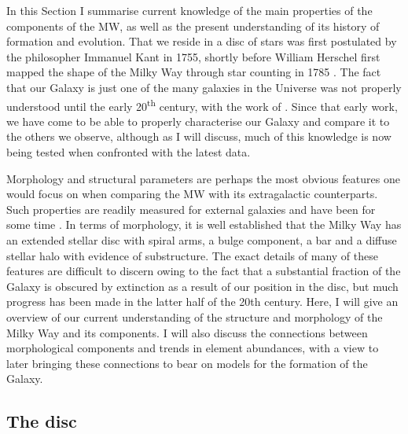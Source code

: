 
In this Section I summarise current knowledge of the main properties of the components of the MW, as well as the present understanding of its history of formation and evolution. That we reside in a disc of stars was first postulated by the philosopher Immanuel Kant in 1755, shortly before William Herschel first mapped the shape of the Milky Way through star counting in 1785 \citep{Herschel01011785}. The fact that our Galaxy is just one of the many galaxies in the Universe was not properly understood until the early 20\textsuperscript{th} century, with the work of \citet{1929ApJ....69..103H}. Since that early work, we have come to be able to properly characterise our Galaxy and compare it to the others we observe, although as I will discuss, much of this knowledge is now being tested when confronted with the latest data.

Morphology and structural parameters are perhaps the most obvious features one would focus on when comparing the MW with its extragalactic counterparts. Such properties are readily measured for external galaxies and have been for some time \citep[e.g.][]{1959HDP....53..311D}. In terms of morphology, it is well established that the Milky Way has an extended stellar disc with spiral arms, a bulge component, a bar and a diffuse stellar halo with evidence of substructure. The exact details of many of these features are difficult to discern owing to the fact that a substantial fraction of the Galaxy is obscured by extinction as a result of our position in the disc, but much progress has been made in the latter half of the 20th century. Here, I will give an overview of our current understanding of the structure and morphology of the Milky Way and its components. I will also discuss the connections between morphological components and trends in element abundances, with a view to later bringing these connections to bear on models for the formation of the Galaxy.

\subsection{The disc}

